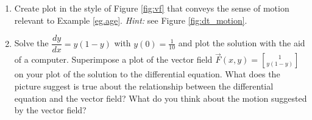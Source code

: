 \documentclass[11pt]{article}
\begin{document}
\begin{enumerate}
\begin{enumerate}
\begin{center}
        \end{center}
      \item Create plot in the style of Figure \ref{fig:vf} that conveys the sense of motion relevant to Example \ref{eg.age}. {\it Hint:} see Figure \ref{fig:dt_motion}. 
      \item Solve the $\dfrac{dy}{dx} = y (1-y)$ with $y(0)=\frac{1}{10}$ and plot the solution with the aid of a computer. Superimpose a plot of the vector field $\vec{F}(x,y) = {1\brack y(1-y)}$ on your plot of the solution to the differential equation. What does the picture suggest is true about the relationship between the differential equation and the vector field? What do you think about the motion suggested by the vector field?
    \end{enumerate}


\end{enumerate}
\end{document}
